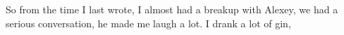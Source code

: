 \noindent {}

So from the time I last wrote, I almost had a breakup with Alexey, we had a serious conversation, he made me laugh a lot. I drank a lot of gin, 
